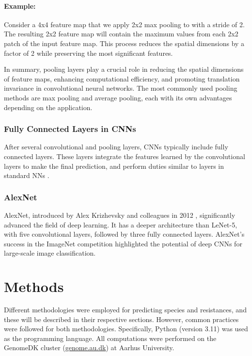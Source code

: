 \documentclass[english,11pt,a4paper,titlepage]{article}
\begin{document}
	\paragraph{Example:}
	Consider a 4x4 feature map that we apply 2x2 max pooling to with a stride of 2. The resulting 2x2 feature map will contain the maximum values from each 2x2 patch of the input feature map. This process reduces the spatial dimensions by a factor of 2 while preserving the most significant features.
	
	In summary, pooling layers play a crucial role in reducing the spatial dimensions of feature maps, enhancing computational efficiency, and promoting translation invariance in convolutional neural networks. The most commonly used pooling methods are max pooling and average pooling, each with its own advantages depending on the application.
	
	\subsubsection*{Fully Connected Layers in CNNs}
	After several convolutional and pooling layers, CNNs typically include fully connected layers. These layers integrate the features learned by the convolutional layers to make the final prediction, and perform duties similar to layers in standard NNs \cite{osheaIntroductionConvolutionalNeural2015}.
	
	\subsubsection*{AlexNet}
	AlexNet, introduced by Alex Krizhevsky and colleagues in 2012 \cite{krizhevskyImageNetClassificationDeep2017}, significantly advanced the field of deep learning. It has a deeper architecture than LeNet-5, with five convolutional layers, followed by three fully connected layers. AlexNet's success in the ImageNet competition highlighted the potential of deep CNNs for large-scale image classification.
		
\section*{Methods}
	Different methodologies were employed for predicting species and resistances, and these will be described in their respective sections. However, common practices were followed for both methodologies. Specifically, Python (version 3.11) \cite{python} was used as the programming language. All computations were performed on the GenomeDK cluster (\url{genome.au.dk}) at Aarhus University.
	
\end{document}
